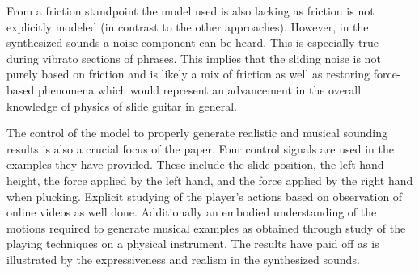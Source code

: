 \documentclass[main.tex]{subfiles}
\begin{document}
From a friction standpoint the model used is also lacking as friction is not explicitly modeled (in contrast to the other approaches). However, in the synthesized sounds a noise component can be heard. This is especially true during vibrato sections of phrases. This implies that the sliding noise is not purely based on friction and is likely a mix of friction as well as restoring force-based phenomena which would represent an advancement in the overall knowledge of physics of slide guitar in general.

The control of the model to properly generate realistic and musical sounding results is also a crucial focus of the paper. Four control signals are used in the examples they have provided. These include the slide position, the left hand height, the force applied by the left hand, and the force applied by the right hand when plucking. Explicit studying of the player's actions based on observation of online videos as well done. Additionally an embodied understanding of the motions required to generate musical examples as obtained through study of the playing techniques on a physical instrument. The results have paid off as is illustrated by the expressiveness and realism in the synthesized sounds.
\end{document}

